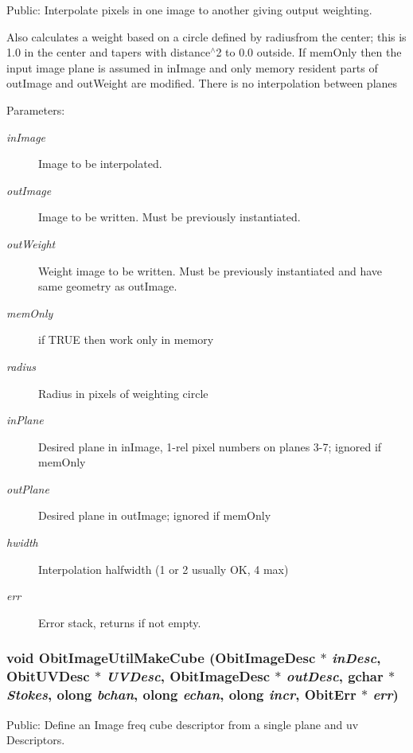 Public: Interpolate pixels in one image to another giving output weighting. 

Also calculates a weight based on a circle defined by radiusfrom the center; this is 1.0 in the center and tapers with distance$^\wedge$2 to 0.0 outside. If mem\-Only then the input image plane is assumed in in\-Image and only memory resident parts of out\-Image and out\-Weight are modified. There is no interpolation between planes \begin{Desc}
\item[Parameters:]
\begin{description}
\item[{\em in\-Image}]Image to be interpolated. \item[{\em out\-Image}]Image to be written. Must be previously instantiated. \item[{\em out\-Weight}]Weight image to be written. Must be previously instantiated and have same geometry as out\-Image. \item[{\em mem\-Only}]if TRUE then work only in memory \item[{\em radius}]Radius in pixels of weighting circle \item[{\em in\-Plane}]Desired plane in in\-Image, 1-rel pixel numbers on planes 3-7; ignored if mem\-Only \item[{\em out\-Plane}]Desired plane in out\-Image; ignored if mem\-Only \item[{\em hwidth}]Interpolation halfwidth (1 or 2 usually OK, 4 max) \item[{\em err}]Error stack, returns if not empty. \end{description}
\end{Desc}
\subsubsection{\setlength{\rightskip}{0pt plus 5cm}void Obit\-Image\-Util\-Make\-Cube ({\bf Obit\-Image\-Desc} $\ast$ {\em in\-Desc}, {\bf Obit\-UVDesc} $\ast$ {\em UVDesc}, {\bf Obit\-Image\-Desc} $\ast$ {\em out\-Desc}, gchar $\ast$ {\em Stokes}, {\bf olong} {\em bchan}, {\bf olong} {\em echan}, {\bf olong} {\em incr}, {\bf Obit\-Err} $\ast$ {\em err})}\label{ObitImageUtil_8c_a18}


Public: Define an Image freq cube descriptor from a single plane and uv Descriptors. 

